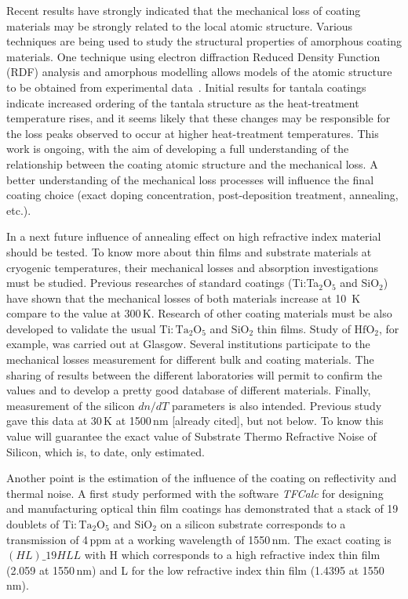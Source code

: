 Recent results have strongly indicated that the mechanical loss of coating materials may be strongly related to the local atomic structure. Various techniques are being used to study the structural properties of amorphous coating materials. One technique using electron diffraction Reduced Density Function (RDF) analysis and amorphous modelling allows models of the atomic structure to be obtained from experimental data~\cite{Bassiri2011}. Initial results for tantala coatings indicate increased ordering of the tantala structure as the heat-treatment temperature rises, and it seems likely that these changes may be responsible for the loss peaks observed to occur at higher heat-treatment temperatures. This work is ongoing, with the aim of developing a full understanding of the relationship between the coating atomic structure and the mechanical loss. A better understanding of the mechanical loss processes will influence the final coating choice (exact doping concentration, post-deposition treatment, annealing, etc.).

In a next future influence of annealing effect on high refractive index material should be tested.
To know more about thin films and substrate materials at cryogenic temperatures, their mechanical losses and absorption investigations must be studied. Previous researches of standard coatings (Ti:Ta$_2$O$_5$ and SiO$_2$) have shown that the mechanical losses of both materials increase at 10\, K compare to the value at 300\,K. %
Research of other coating materials must be also developed to validate the usual $\mathrm{Ti:Ta_2O_5}$ and $\mathrm{SiO_2}$ thin films. Study of $\mathrm{HfO_2}$, for example, was carried out at Glasgow. Several institutions participate to the mechanical losses measurement for different bulk and coating materials. The sharing of results between the different laboratories will permit to confirm the values and to develop a pretty good database of different materials. Finally, measurement of the silicon $dn/dT$ parameters is also intended. Previous study gave this data at 30\,K at 1500\,nm [already cited], but not below. To know this value will guarantee the exact value of Substrate Thermo Refractive Noise of Silicon, which is, to date, only estimated.

Another point is the estimation of the influence of the coating on reflectivity and thermal noise. A first study performed with the software \emph{TFCalc} for designing and manufacturing optical thin film coatings has demonstrated that a stack of 19 doublets of $\mathrm{Ti:Ta_2O_5}$ and $\mathrm{SiO_2}$ on a silicon substrate corresponds to a transmission of 4\,ppm at a working wavelength of 1550\,nm. The exact coating is $(HL)\_{19}HLL$ with H which corresponds to a high refractive index thin film (2.059 at 1550\,nm) and L for the low refractive index thin film (1.4395 at 1550\,nm).

